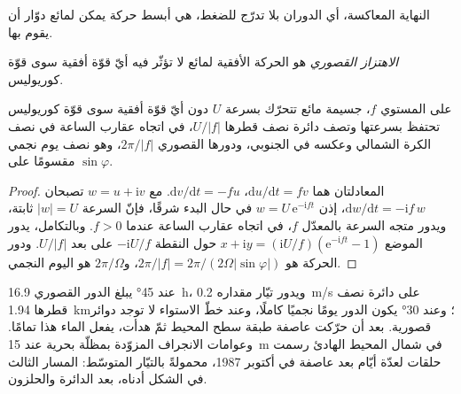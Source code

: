 النهاية المعاكسة، أي الدوران بلا تدرّج للضغط، هي أبسط
حركة يمكن لمائع دوّار أن يقوم بها.

\begin{definition}\label{def:b3:gfd-foundations:inertial}
\emph{الاهتزاز القصوري} هو
الحركة الأفقية لمائع لا تؤثّر فيه أيّ قوّة أفقية
سوى قوّة كوريوليس.
\end{definition}

\begin{theorem}\label{thm:b3:gfd-foundations:inertial}
على المستوي $f$، جسيمة مائع تتحرّك بسرعة $U$ دون أيّ قوّة أفقية
سوى قوّة كوريوليس تحتفظ بسرعتها وتصف دائرة نصف قطرها
$U/|f|$، في اتجاه عقارب الساعة في نصف الكرة الشمالي وعكسه في الجنوبي،
ودورها القصوري $2\pi/|f|$، وهو نصف يوم نجمي
مقسومًا على $\sin\varphi$.
\end{theorem}

\begin{proof}
المعادلتان هما $\mathrm du/\mathrm dt = fv$، $\mathrm dv/\mathrm dt =
-fu$. مع $w = u + \mathrm iv$ تصبحان $\mathrm dw/\mathrm dt = -\mathrm
if\,w$، إذن $w = U\,\mathrm e^{-\mathrm ift}$ في حال البدء شرقًا، فإنّ
السرعة $|w| = U$ ثابتة، ويدور متجه السرعة بالمعدّل $f$،
في اتجاه عقارب الساعة عندما $f > 0$. وبالتكامل، يدور الموضع $x + \mathrm iy =
(\mathrm iU/f)(\mathrm e^{-\mathrm ift} - 1)$ حول النقطة
$-\mathrm iU/f$ على بعد $U/|f|$. ودور الحركة هو $2\pi/|f| =
2\pi/(2\Omega|\sin\varphi|)$، و$2\pi/\Omega$ هو اليوم النجمي.
\end{proof}

عند \ang{45} يبلغ الدور القصوري \qty{16.9}{h}، ويدور تيّار مقداره
\qty{0.2}{m/s} على دائرة نصف قطرها \qty{1.94}{km}؛ وعند \ang{30} يكون الدور
يومًا نجميًا كاملًا، وعند خطّ الاستواء لا توجد دوائر قصورية.
بعد أن حرّكت عاصفة طبقة سطح المحيط ثمّ هدأت،
يفعل الماء هذا تمامًا. وعوامات الانجراف المزوّدة بمظلّة بحرية عند \qty{15}{m} في
شمال المحيط الهادئ رسمت حلقات لعدّة أيّام بعد عاصفة في أكتوبر 1987، محمولةً
بالتيّار المتوسّط: المسار الثالث في الشكل أدناه، بعد
الدائرة والحلزون.

